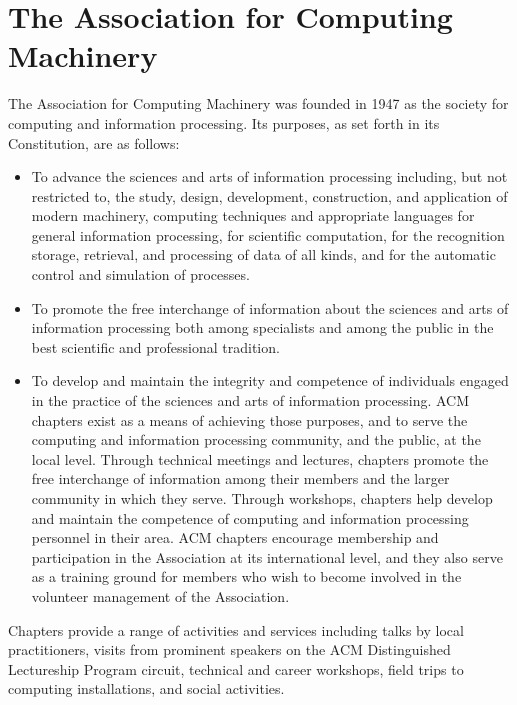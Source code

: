 \section{The Association for Computing Machinery}
\label{sec:sec02}

The Association for Computing Machinery was founded in 1947 as the society for
computing and information processing. Its purposes, as set forth in its
Constitution, are as follows:
	\begin{itemize}
		\item To advance the sciences and arts of information processing including,
					but not restricted to, the study, design, development, construction,
					and application of modern machinery, computing techniques and
					appropriate languages for general information processing, for
					scientific computation, for the recognition storage, retrieval, and
					processing of data of all kinds, and for the automatic control and
					simulation of processes.
    \item To promote the free interchange of information about the sciences and
					arts of information processing both among specialists and among the
					public in the best scientific and professional tradition.
    \item To develop and maintain the integrity and competence of individuals
					engaged in the practice of the sciences and arts of information
					processing. ACM chapters exist as a means of achieving those purposes,
					and to serve the computing and information processing community, and
					the public, at the local level. Through technical meetings and lectures,
					chapters promote the free interchange of information among their members
					and the larger community in which they serve. Through workshops, chapters
					help develop and maintain the competence of computing and information
					processing personnel in their area. ACM chapters encourage membership
					and participation in the Association at its international level, and
					they also serve as a training ground for members who wish to become
					involved in the volunteer management of the Association.
	\end{itemize}

Chapters provide a range of activities and services including talks by local
practitioners, visits from prominent speakers on the ACM Distinguished
Lectureship Program circuit, technical and career workshops, field trips to
computing installations, and social activities.

